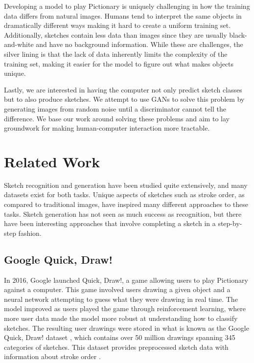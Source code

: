 \documentclass[10pt,twocolumn,letterpaper]{article}
\begin{document}
Developing a model to play Pictionary is uniquely challenging in how the training data differs from natural images. Humans tend to interpret the same objects in dramatically different ways making it hard to create a uniform training set. Additionally, sketches contain less data than images since they are usually black-and-white and have no background information. While these are challenges, the silver lining is that the lack of data inherently limits the complexity of the training set, making it easier for the model to figure out what makes objects unique.

Lastly, we are interested in having the computer not only predict sketch classes but to also produce sketches. We attempt to use GANs to solve this problem by generating images from random noise until a discriminator cannot tell the difference. We base our work around solving these problems and aim to lay groundwork for making human-computer interaction more tractable.

\section{Related Work}

Sketch recognition and generation have been studied quite extensively, and many datasets exist for both tasks. Unique aspects of sketches such as stroke order, as compared to traditional images, have inspired many different approaches to these tasks. Sketch generation has not seen as much success as recognition, but there have been interesting approaches that involve completing a sketch in a step-by-step fashion.

\subsection{Google Quick, Draw!}

In 2016, Google launched Quick, Draw!, a game allowing users to play Pictionary against a computer. This game involved users drawing a given object and a neural network attempting to guess what they were drawing in real time. The model improved as users played the game through reinforcement learning, where more user data made the model more robust at understanding how to classify sketches. The resulting user drawings were stored in what is known as the Google Quick, Draw! dataset \cite{QuickDraw}, which contains over 50 million drawings spanning 345 categories of sketches. This dataset provides preprocessed sketch data with information about stroke order \cite{QuickDraw}.
\end{document}
